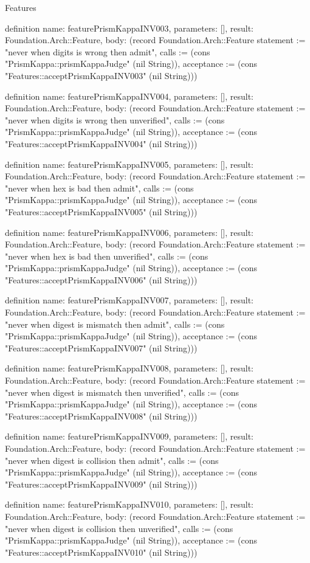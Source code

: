 \begin{lexlean}{Features}
\begin{semanticmodule}
definition{
  name: featurePrismKappaINV003,
  parameters: [],
  result: Foundation.Arch::Feature,
  body: (record Foundation.Arch::Feature {statement := "never when digits is wrong then admit", calls := (cons "PrismKappa::prismKappaJudge" (nil String)), acceptance := (cons "Features::acceptPrismKappaINV003" (nil String))})
}

definition{
  name: featurePrismKappaINV004,
  parameters: [],
  result: Foundation.Arch::Feature,
  body: (record Foundation.Arch::Feature {statement := "never when digits is wrong then unverified", calls := (cons "PrismKappa::prismKappaJudge" (nil String)), acceptance := (cons "Features::acceptPrismKappaINV004" (nil String))})
}

definition{
  name: featurePrismKappaINV005,
  parameters: [],
  result: Foundation.Arch::Feature,
  body: (record Foundation.Arch::Feature {statement := "never when hex is bad then admit", calls := (cons "PrismKappa::prismKappaJudge" (nil String)), acceptance := (cons "Features::acceptPrismKappaINV005" (nil String))})
}

definition{
  name: featurePrismKappaINV006,
  parameters: [],
  result: Foundation.Arch::Feature,
  body: (record Foundation.Arch::Feature {statement := "never when hex is bad then unverified", calls := (cons "PrismKappa::prismKappaJudge" (nil String)), acceptance := (cons "Features::acceptPrismKappaINV006" (nil String))})
}

definition{
  name: featurePrismKappaINV007,
  parameters: [],
  result: Foundation.Arch::Feature,
  body: (record Foundation.Arch::Feature {statement := "never when digest is mismatch then admit", calls := (cons "PrismKappa::prismKappaJudge" (nil String)), acceptance := (cons "Features::acceptPrismKappaINV007" (nil String))})
}

definition{
  name: featurePrismKappaINV008,
  parameters: [],
  result: Foundation.Arch::Feature,
  body: (record Foundation.Arch::Feature {statement := "never when digest is mismatch then unverified", calls := (cons "PrismKappa::prismKappaJudge" (nil String)), acceptance := (cons "Features::acceptPrismKappaINV008" (nil String))})
}

definition{
  name: featurePrismKappaINV009,
  parameters: [],
  result: Foundation.Arch::Feature,
  body: (record Foundation.Arch::Feature {statement := "never when digest is collision then admit", calls := (cons "PrismKappa::prismKappaJudge" (nil String)), acceptance := (cons "Features::acceptPrismKappaINV009" (nil String))})
}

definition{
  name: featurePrismKappaINV010,
  parameters: [],
  result: Foundation.Arch::Feature,
  body: (record Foundation.Arch::Feature {statement := "never when digest is collision then unverified", calls := (cons "PrismKappa::prismKappaJudge" (nil String)), acceptance := (cons "Features::acceptPrismKappaINV010" (nil String))})
}


\end{semanticmodule}
\end{lexlean}
